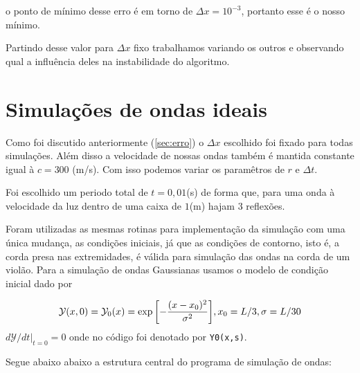\documentclass[a4paper, 11pt]{tufte-handout}
\begin{document}
o ponto de mínimo desse erro é em torno de \( \Delta x = 10^{-3} \), portanto esse é o nosso mínimo.

Partindo desse valor para \( \Delta x\) fixo trabalhamos variando os outros e observando qual a
influência deles na instabilidade do algoritmo.

\section{Simulações de ondas ideais}


Como foi discutido anteriormente (\ref{sec:erro}) o $\Delta x$ escolhido
foi fixado para todas simulações. Além disso a velocidade de nossas ondas também é mantida constante
igual à \( c = 300\) (m/s). Com isso podemos variar os paramêtros de \( r \) e \( \Delta t \). 

Foi escolhido um periodo total de \( t = 0,01\)(s)  de forma que, para uma onda à velocidade da luz
dentro de uma caixa de \( 1\)(m) hajam 3 reflexões.


Foram utilizadas as mesmas rotinas para implementação da simulação com uma única mudança, as
condições iniciais, já que as condições de contorno, isto é, a corda presa nas extremidades, é
válida para simulação das ondas na corda de um violão. Para a simulação de ondas Gaussianas usamos o
modelo de condição inicial dado por 

\begin{equation}
    \mathcal{Y}(x, 0) = \mathcal{Y}_0 (x) = \exp{\left[- \frac{(x-x_0)^2}{\sigma^2}\right]}, x_0 = L/3, \sigma = L/30 \\
  \label{eq:y_0}
\end{equation}
\( d \mathcal{Y} / d t |_{t = 0} = 0 \)
onde no código foi denotado por  \verb|Y0(x,s)|.


Segue abaixo abaixo a estrutura central do programa de simulação de ondas:
\end{document}
